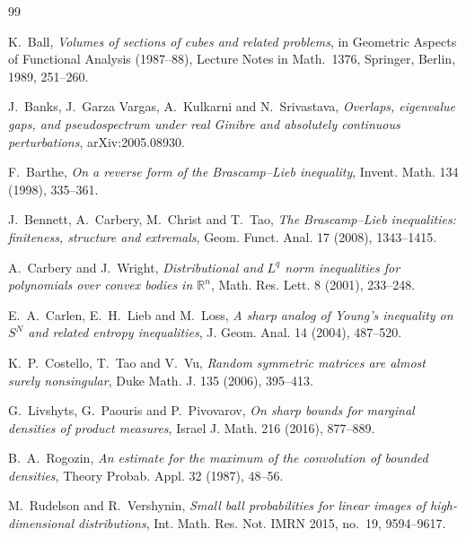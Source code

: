 \documentclass[11pt]{amsart}
\numberwithin{equation}{section}
\theoremstyle{definition}
\theoremstyle{remark}
\newcommand{\R}{\mathbb R}
\newcommand{\1}{\mathbf 1}
\begin{document}
\begin{thebibliography}{99}

 K.~Ball, \emph{Volumes of sections of cubes and related problems}, in Geometric Aspects of Functional Analysis (1987--88), Lecture Notes in Math.~1376, Springer, Berlin, 1989, 251--260.

 J.~Banks, J.~Garza Vargas, A.~Kulkarni and N.~Srivastava, \emph{Overlaps, eigenvalue gaps, and pseudospectrum under real Ginibre and absolutely continuous perturbations}, arXiv:2005.08930.

 F.~Barthe, \emph{On a reverse form of the Brascamp--Lieb inequality}, Invent. Math. 134 (1998), 335--361.

 J.~Bennett, A.~Carbery, M.~Christ and T.~Tao, \emph{The Brascamp--Lieb inequalities: finiteness, structure and extremals}, Geom. Funct. Anal. 17 (2008), 1343--1415.

 A.~Carbery and J.~Wright, \emph{Distributional and $L^q$ norm inequalities for polynomials over convex bodies in $\R^n$}, Math. Res. Lett. 8 (2001), 233--248.

 E.~A.~Carlen, E.~H.~Lieb and M.~Loss, \emph{A sharp analog of Young's inequality on $S^N$ and related entropy inequalities}, J. Geom. Anal. 14 (2004), 487--520.

 K.~P.~Costello, T.~Tao and V.~Vu, \emph{Random symmetric matrices are almost surely nonsingular}, Duke Math. J. 135 (2006), 395--413.

 G.~Livshyts, G.~Paouris and P.~Pivovarov, \emph{On sharp bounds for marginal densities of product measures}, Israel J. Math. 216 (2016), 877--889.

 B.~A.~Rogozin, \emph{An estimate for the maximum of the convolution of bounded densities}, Theory Probab. Appl. 32 (1987), 48--56.

 M.~Rudelson and R.~Vershynin, \emph{Small ball probabilities for linear images of high-dimensional distributions}, Int. Math. Res. Not. IMRN 2015, no.~19, 9594--9617.

\end{thebibliography}
\end{document}
